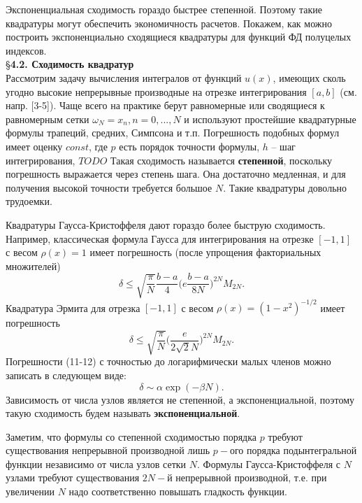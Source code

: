 Экспоненциальная сходимость гораздо быстрее степенной. Поэтому такие квадратуры могут обеспечить экономичность расчетов. Покажем, как можно построить экспоненциально сходящиеся квадратуры для функций ФД полуцелых индексов.
\\


\S \textbf{4.2. Сходимость квадратур}
\\

Рассмотрим задачу вычисления интегралов от функций $u(x)$, имеющих сколь угодно высокие непрерывные производные на отрезке интегрирования $[a,b]$ (см. напр. [3-5]). Чаще всего на практике берут
равномерные или сводящиеся к равномерным сетки $ \omega_N={x_n,n=0,...,N}$ и
используют простейшие квадратурные формулы трапеций, средних, Симпсона
и т.п. Погрешность подобных формул имеет оценку
$const$, где $p$ есть порядок точности формулы, $h$ – шаг интегрирования, $TODO$ Такая сходимость называется
\textbf{степенной}, поскольку погрешность выражается через степень шага. Она
достаточно медленная, и для получения высокой точности требуется большое $N$.
Такие квадратуры довольно трудоемки.

Квадратуры Гаусса-Кристоффеля дают гораздо более быструю
сходимость. Например, классическая формула Гаусса для интегрирования на
отрезке $[-1,1]$ с весом $\rho(x)=1$ имеет погрешность (после упрощения
факториальных множителей)
\begin{equation}
\delta  \leqslant \sqrt{\frac{\pi}{N}}\frac{b-a}{4}\Bigg(e\frac{b-a}{8N}\Bigg)^{2N}M_{2N}.
\label{eq:ref_4_2_1}
\end{equation}
Квадратура Эрмита для отрезка $[-1,1]$ с весом $\rho(x)=(1-x^2)^{-1/2}$ имеет
погрешность
\begin{equation}
\delta \leqslant \sqrt{\frac{\pi}{N}}\Bigg(\frac{e}{2\sqrt{2}N}\Bigg)^{2N}M_{2N}.
\label{eq:ref_4_2_2}
\end{equation}
Погрешности (11-12) с точностью до логарифмически малых членов можно
записать в следующем виде:
\begin{equation}
\delta \sim \alpha \exp{(-\beta N)}.
\label{eq:ref_4_2_3}
\end{equation}
Зависимость от числа узлов является не степенной, а экспоненциальной,
поэтому такую сходимость будем называть \textbf{экспоненциальной}.

Заметим, что формулы со степенной сходимостью порядка $p$ требуют существования непрерывной производной лишь $p-$ого порядка подынтегральной функции независимо от числа узлов сетки $N$. Формулы Гаусса-Кристоффеля с $N$ узлами требуют существования $2N-$й непрерывной производной, т.е. при увеличении $N$ надо соответственно повышать гладкость функции.

